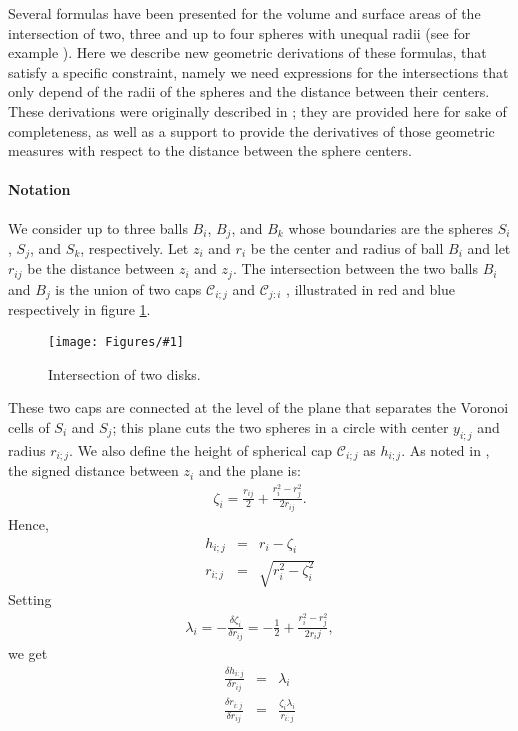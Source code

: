 \documentclass[11 pt]{article}
\theoremstyle{plain} \theorembodyfont{\rmfamily}
\newcommand{\centerfig}[2]{%
\centerline{\texttt{[image: Figures/\#1]}}
}
\begin{document}
Several formulas have been presented for the volume and surface areas of the intersection of two, three and up to four spheres with unequal radii (see for example \cite{GS87, GS88, EdFu94}). Here we describe new geometric derivations of these formulas,  that satisfy a specific constraint, namely we need expressions for the intersections that only depend of the radii of the spheres and the distance between their centers. These derivations were originally described in \cite{MK11}; they are provided here for sake of completeness, as well as a support to provide the derivatives of those geometric measures with respect to the distance between the sphere centers.

\paragraph{Notation}  We consider up to three balls $B_i$, $B_j$, and $B_k$ whose boundaries are the spheres $S_i$, $S_j$, and $S_k$, respectively.  Let $z_i$ and $r_i$ be the center and radius of ball $B_i$ and let $r_{ij}$ be the distance between $z_i$ and $z_j$.  The intersection between the two balls $B_i$ and $B_j$ is the union of two caps $\mathcal{C}_{i;j}$ and $\mathcal{C}_{j:i}$ , illustrated in red and blue respectively in figure \ref{fig:TwoSphere1}. 

\begin{figure}[hbt]
\centerfig{Twosphere1}{height=1.5in}
\caption{ Intersection of two disks.}
\label{fig:TwoSphere1}
\end{figure}

These two caps are connected at the level of the plane that separates the Voronoi cells of $S_i$ and $S_j$; this plane cuts the two spheres in a circle  with center $y_{i;j}$ and radius $r_{i;j}$.  We also define the height of spherical cap $\mathcal{C}_{i;j}$ as $h_{i;j}$. As noted in \cite{BEKL04}, the signed distance between $z_i$ and the plane is:
\begin{eqnarray}
\zeta_i = \frac{r_{ij}}{2}  + \frac{r_i^2 - r_j^2}{2r_{ij}}.
\label{eqn:zeta}
\end{eqnarray}
Hence,
\begin{eqnarray}
h_{i;j} &=& r_i - \zeta_i \label{eqn:capheight} \\
r_{i;j}  &=& \sqrt{r_i^2 - \zeta_i^2} \label{eqn:disk_rad}
\end{eqnarray}
Setting 
\begin{eqnarray}
\lambda_i = -\frac{\delta \zeta_i}{\delta r_{ij}} = -\frac{1}{2} + \frac{r_i^2 - r_j^2}{2r_ij},
\end{eqnarray}
we get
\begin{eqnarray}
\frac{\delta h_{i:j}}{\delta r_{ij}} &=& \lambda_i \\
\frac{\delta r_{i:j}}{\delta r_{ij}} &=& \frac{\zeta_i \lambda_i}{r_{i:j}}
\end{eqnarray}
\end{document}
